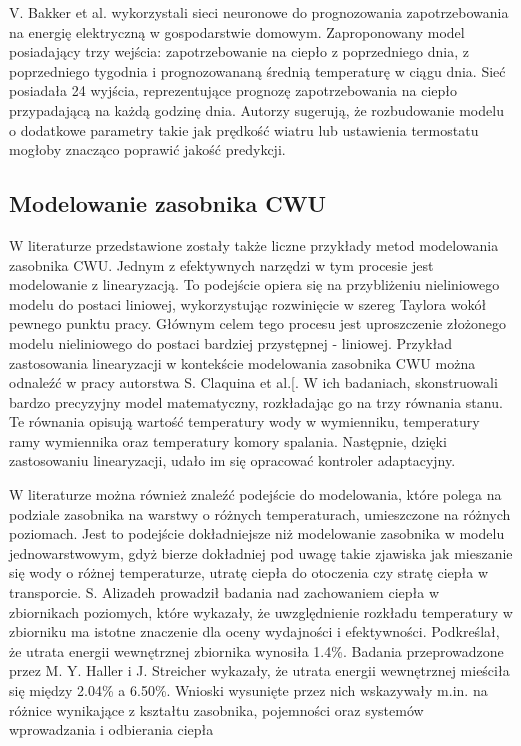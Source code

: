 \documentclass[a4paper,twoside,12pt]{book}
\begin{document}
V. Bakker et al.\cite{bib:model_przewidywania} wykorzystali sieci neuronowe do prognozowania zapotrzebowania na energię elektryczną w gospodarstwie domowym. Zaproponowany model posiadający trzy wejścia: zapotrzebowanie na ciepło z poprzedniego dnia, z poprzedniego tygodnia i prognozowananą średnią temperaturę w ciągu dnia. Sieć posiadała 24 wyjścia, reprezentujące prognozę zapotrzebowania na ciepło przypadającą na każdą godzinę dnia. Autorzy sugerują, że rozbudowanie modelu o dodatkowe parametry takie jak prędkość wiatru lub ustawienia termostatu mogłoby znacząco poprawić jakość predykcji.

\subsection{Modelowanie zasobnika CWU}
W literaturze przedstawione zostały także liczne przykłady metod modelowania zasobnika CWU. Jednym z efektywnych narzędzi w tym procesie jest modelowanie z linearyzacją. To podejście opiera się na przybliżeniu nieliniowego modelu do postaci liniowej, wykorzystując rozwinięcie w szereg Taylora wokół pewnego punktu pracy. Głównym celem tego procesu jest uproszczenie złożonego modelu nieliniowego do postaci bardziej przystępnej - liniowej. Przykład zastosowania linearyzacji w kontekście modelowania zasobnika CWU można odnaleźć w pracy autorstwa S. Claquina et al.[\cite{bib:linearyzacja}. W ich badaniach, skonstruowali bardzo precyzyjny model matematyczny, rozkładając go na trzy równania stanu. Te równania opisują wartość temperatury wody w wymienniku, temperatury ramy wymiennika oraz temperatury komory spalania. Następnie, dzięki zastosowaniu linearyzacji, udało im się opracować kontroler adaptacyjny.

W literaturze można również znaleźć podejście do modelowania, które polega na podziale zasobnika na warstwy o różnych temperaturach, umieszczone na różnych poziomach. Jest to podejście dokładniejsze niż modelowanie zasobnika w modelu jednowarstwowym, gdyż bierze dokładniej pod uwagę takie zjawiska jak mieszanie się wody o różnej temperaturze, utratę ciepła do otoczenia czy stratę ciepła w transporcie. S. Alizadeh\cite{bib:model_2} prowadził badania nad zachowaniem ciepła w zbiornikach poziomych, które wykazały, że uwzględnienie rozkładu temperatury w zbiorniku ma istotne znaczenie dla oceny wydajności i efektywności. Podkreślał, że utrata energii wewnętrznej zbiornika wynosiła 1.4\%. Badania przeprowadzone przez M. Y. Haller i J. Streicher\cite{bib:model_1} wykazały, że utrata energii wewnętrznej mieściła się między 2.04\% a 6.50\%. Wnioski wysunięte przez nich wskazywały m.in. na różnice wynikające z kształtu zasobnika, pojemności oraz systemów wprowadzania i odbierania ciepła
\end{document}
